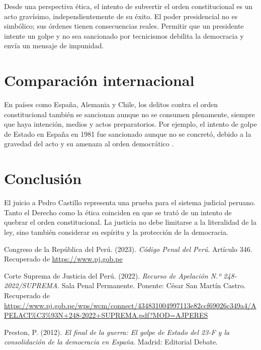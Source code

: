 \documentclass[12pt]{article}
\begin{document}
	Desde una perspectiva ética, el intento de subvertir el orden constitucional es un acto gravísimo, independientemente de su éxito. El poder presidencial no es simbólico; sus órdenes tienen consecuencias reales. Permitir que un presidente intente un golpe y no sea sancionado por tecnicismos debilita la democracia y envía un mensaje de impunidad.
	
	\section*{Comparación internacional}
	
	En países como España, Alemania y Chile, los delitos contra el orden constitucional también se sancionan aunque no se consumen plenamente, siempre que haya intención, medios y actos preparatorios. Por ejemplo, el intento de golpe de Estado en España en 1981 fue sancionado aunque no se concretó, debido a la gravedad del acto y su amenaza al orden democrático \cite{golpe_espana}.
	
	\section*{Conclusión}
	
	El juicio a Pedro Castillo representa una prueba para el sistema judicial peruano. Tanto el Derecho como la ética coinciden en que se trató de un intento de quebrar el orden constitucional. La justicia no debe limitarse a la literalidad de la ley, sino también considerar su espíritu y la protección de la democracia.
	
	\begin{thebibliography}{9}
		
		Congreso de la República del Perú. (2023). \textit{Código Penal del Perú}. Artículo 346. Recuperado de \url{https://www.pj.gob.pe}
		
		Corte Suprema de Justicia del Perú. (2022). \textit{Recurso de Apelación N.º 248-2022/SUPREMA}. Sala Penal Permanente. Ponente: César San Martín Castro. Recuperado de \url{https://www.pj.gob.pe/wps/wcm/connect/434831004997113e82ccf69026c349a4/APELACI%C3%93N+248-2022+SUPREMA.pdf?MOD=AJPERES}
		
		Preston, P. (2012). \textit{El final de la guerra: El golpe de Estado del 23-F y la consolidación de la democracia en España}. Madrid: Editorial Debate.
		
	\end{thebibliography}
	
\end{document}

